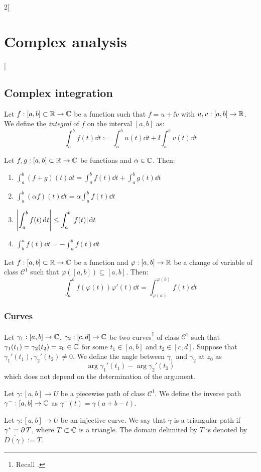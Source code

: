 \documentclass[../../../main_math.tex]{subfiles}
\begin{document}
\begin{multicols}{2}[\section{Complex analysis}]
  \subsection{Complex integration}
  \begin{definition}
    Let $f:[a,b]\subset\mathbb{R}\rightarrow\mathbb{C}$ be a function such that $f=u+\ii v$ with $u,v:[a,b]\rightarrow\mathbb{R}$. We define the \emph{integral} of $f$ on the interval $[a,b]$ as: $$\int_a^bf(t)\dd{t}:=\int_a^bu(t)\dd{t}+\ii\int_a^bv(t)\dd{t}$$
  \end{definition}
  \begin{proposition}
    Let $f,g:[a,b]\subset\mathbb{R}\rightarrow\mathbb{C}$ be functions and $\alpha\in\mathbb{C}$. Then:
    \begin{enumerate}
      \item $\displaystyle\int_a^b(f+g)(t)\dd{t}=\int_a^bf(t)\dd{t}+\int_a^bg(t)\dd{t}$
      \item $\displaystyle\int_a^b(\alpha f)(t)\dd{t}=\alpha \int_a^bf(t)\dd{t}$
      \item $\displaystyle\abs{\int_a^bf(t)\dd{t}}\leq\int_a^b|f(t)|\dd{t}$
      \item $\displaystyle \int_b^af(t)\dd{t}=-\int_a^bf(t)\dd{t}$
    \end{enumerate}
  \end{proposition}
  \begin{proposition}
    Let $f:[a,b]\subset\mathbb{R}\rightarrow\mathbb{C}$ be a function and $\varphi:[a,b]\rightarrow\mathbb{R}$ be a change of variable of class $\mathcal{C}^1$ such that $\varphi([a,b])\subseteq[a,b]$. Then: $$\int_a^bf(\varphi(t))\varphi'(t)\dd{t}=\int_{\varphi(a)}^{\varphi(b)}f(t)\dd{t}$$
  \end{proposition}
  \subsubsection{Curves}
  \begin{definition}
    Let $\gamma_1:[a,b]\rightarrow\mathbb{C}$, $\gamma_2:[c,d]\rightarrow\mathbb{C}$ be two curves\footnote{Recall .} of class $\mathcal{C}^1$ such that $\gamma_1(t_1)=\gamma_2(t_2)=z_0\in\mathbb{C}$ for some $t_1\in[a,b]$ and $t_2\in[c,d]$. Suppose that ${\gamma_1}'(t_1),{\gamma_2}'(t_2)\ne 0$. We define the angle between $\gamma_1$ and $\gamma_2$ at $z_0$ as $$\arg{\gamma_1}'(t_1)-\arg{\gamma_2}'(t_2)$$ which does not depend on the determination of the argument.
  \end{definition}
  \begin{definition}
    Let $\gamma:[a,b]\rightarrow U$ be a piecewise path of class $\mathcal{C}^1$. We define the inverse path $\gamma^-:[a,b]\rightarrow\mathbb{C}$ as $\gamma^-(t)=\gamma(a+b-t)$.
  \end{definition}
  \begin{definition}
    Let $\gamma:[a,b]\rightarrow U$ be an injective curve. We say that $\gamma$ is a triangular path if $\gamma^*=\operatorname{\partial} T$, where $T\subset\mathbb{C}$ is a triangle. The domain delimited by $T$ is denoted by $\overline{D(\gamma)}:=\overline{T}$.
  \end{definition}

\end{multicols}
\end{document}
